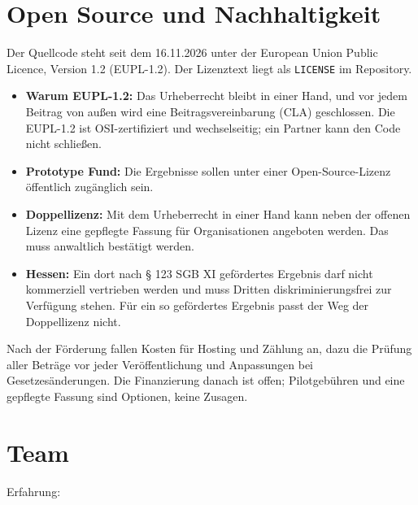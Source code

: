 \documentclass[11pt,a4paper,parskip=half-]{scrartcl}
\begin{document}
\section{Open Source und Nachhaltigkeit}\label{sec:oss}
Der Quellcode steht seit dem 16.11.2026 unter der European Union Public Licence, Version 1.2
(EUPL-1.2). Der Lizenztext liegt als \texttt{LICENSE} im Repository.
\begin{itemize}
  \item \textbf{Warum EUPL-1.2:} Das Urheberrecht bleibt in einer Hand, und vor jedem
        Beitrag von außen wird eine Beitragsvereinbarung (CLA) geschlossen. Die EUPL-1.2 ist
        OSI-zertifiziert und wechselseitig; ein Partner kann den Code nicht schließen.
  \item \textbf{Prototype Fund:} Die Ergebnisse sollen unter einer Open-Source-Lizenz öffentlich
        zugänglich sein.
  \item \textbf{Doppellizenz:} Mit dem Urheberrecht in einer Hand kann neben der offenen Lizenz
        eine gepflegte Fassung für Organisationen angeboten werden. Das muss anwaltlich bestätigt werden.
  \item \textbf{Hessen:} Ein dort nach § 123 SGB XI gefördertes Ergebnis darf nicht kommerziell
        vertrieben werden und muss Dritten diskriminierungsfrei zur Verfügung stehen. Für ein so
        gefördertes Ergebnis passt der Weg der Doppellizenz nicht.
\end{itemize}
Nach der Förderung fallen Kosten für Hosting und Zählung an, dazu die Prüfung aller Beträge vor
jeder Veröffentlichung und Anpassungen bei Gesetzesänderungen. Die Finanzierung danach ist offen;
Pilotgebühren und eine gepflegte Fassung sind Optionen, keine Zusagen.

\section{Team}
%
\quad Erfahrung: 

\end{document}
